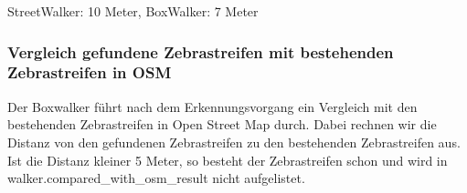  StreetWalker: 10 Meter, BoxWalker: 7 Meter

\subsubsection{Vergleich gefundene Zebrastreifen mit bestehenden Zebrastreifen in OSM}
Der Boxwalker führt nach dem Erkennungsvorgang ein Vergleich mit den bestehenden Zebrastreifen in Open Street Map durch. Dabei rechnen wir die Distanz von den gefundenen Zebrastreifen zu den bestehenden Zebrastreifen aus. Ist die Distanz kleiner 5 Meter, so besteht der Zebrastreifen schon und wird in walker.compared\_with\_osm\_result nicht aufgelistet.








